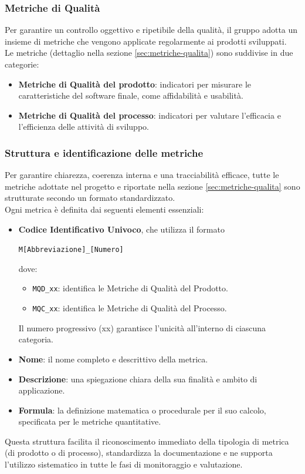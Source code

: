 \subsubsection{Metriche di Qualità}
Per garantire un controllo oggettivo e ripetibile della qualità, il gruppo adotta un insieme di metriche che vengono applicate regolarmente ai prodotti sviluppati.\\
Le metriche (dettaglio nella sezione \ref{sec:metriche-qualita}) sono suddivise in due categorie:
\begin{itemize}[itemsep=3pt, parsep=1pt, label=$\scriptstyle\bullet$]
    \item \textbf{Metriche di Qualità del prodotto}: indicatori per misurare le caratteristiche del software finale, come affidabilità e usabilità.
    \item \textbf{Metriche di Qualità del processo}: indicatori per valutare l'efficacia e l'efficienza delle attività di sviluppo.
\end{itemize}

\subsubsection{Struttura e identificazione delle metriche}
\label{sec:struttura-metriche}
Per garantire chiarezza, coerenza interna e una tracciabilità efficace, tutte le metriche adottate nel progetto e riportate nella sezione \ref{sec:metriche-qualita} sono strutturate secondo un formato standardizzato.\\
Ogni metrica è definita dai seguenti elementi essenziali:
\begin{itemize}[itemsep=3pt, parsep=1pt, label=$\scriptstyle\bullet$]
    \item \textbf{Codice Identificativo Univoco}, che utilizza il formato 
    \begin{center}
        \texttt{M[Abbreviazione]\_[Numero]}
    \end{center}
    dove:
    \begin{itemize}[label=\textendash, itemsep=0pt, parsep=1pt, leftmargin=1.5em]
        \item \texttt{MQD\_xx}: identifica le Metriche di Qualità del Prodotto.
        \item \texttt{MQC\_xx}: identifica le Metriche di Qualità del Processo.
    \end{itemize}
    Il numero progressivo (xx) garantisce l'unicità all'interno di ciascuna categoria.
    \item \textbf{Nome}: il nome completo e descrittivo della metrica.
    \item \textbf{Descrizione}: una spiegazione chiara della sua finalità e ambito di applicazione.
    \item \textbf{Formula}: la definizione matematica o procedurale per il suo calcolo, specificata per le metriche quantitative.
\end{itemize}
Questa struttura facilita il riconoscimento immediato della tipologia di metrica (di prodotto o di processo), standardizza la documentazione e ne supporta l'utilizzo sistematico in tutte le fasi di monitoraggio e valutazione.

